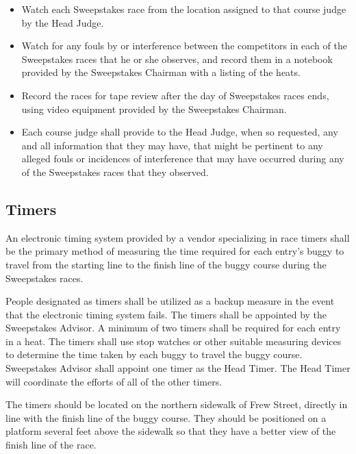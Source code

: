 	\begin{itemize}

		\item Watch each Sweepstakes race from the location assigned to that course judge by the Head Judge.

		\item Watch for any fouls by or interference between the competitors in each of the Sweepstakes races that he or she observes, and record them in a notebook provided by the Sweepstakes Chairman with a listing of the heats.

		\item Record the races for tape review after the day of Sweepstakes races ends, using video equipment provided by the Sweepstakes Chairman.

		\item Each course judge shall provide to the Head Judge, when so requested, any and all information that they may have, that might be pertinent to any alleged fouls or incidences of interference that may have occurred during any of the Sweepstakes races that they observed.

	\end{itemize}

\subsection{Timers}

	An electronic timing system provided by a vendor specializing in race timers shall be the primary method of measuring the time required for each entry's buggy to travel from the starting line to the finish line of the buggy course during the Sweepstakes races. 

	People designated as timers shall be utilized as a backup measure in the event that the electronic timing system fails. The timers shall be appointed by the Sweepstakes Advisor. A minimum of two timers shall be required for each entry in a heat. The timers shall use stop watches or other suitable measuring devices to determine the time taken by each buggy to travel the buggy course. Sweepstakes Advisor shall appoint one timer as the Head Timer. The Head Timer will coordinate the efforts of all of the other timers.

	The timers should be located on the northern sidewalk of Frew Street, directly in line with the finish line of the buggy course. They should be positioned on a platform several feet above the sidewalk so that they have a better view of the finish line of the race.


